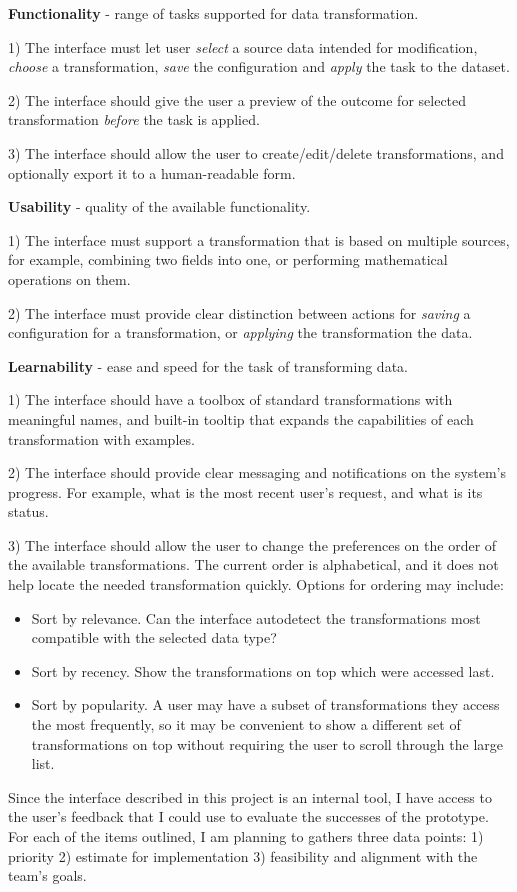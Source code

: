 \documentclass[12pt,letterpaper]{article}
\begin{document}
\bigskip
\textbf{Functionality} - range of tasks supported for data transformation.

1) The interface must let user \textit{select} a source data intended for modification, \textit{choose} a transformation, \textit{save} the configuration and \textit{apply} the task to the dataset.

2) The interface should give the user a preview of the outcome for selected transformation \textit{before} the task is applied.

3) The interface should allow the user to create/edit/delete transformations, and optionally export it to a human-readable form.

\textbf{Usability} - quality of the available functionality.

1) The interface must support a transformation that is based on multiple sources, for example, combining two fields into one, or performing mathematical operations on them.

2) The interface must provide clear distinction between actions for \textit{saving} a configuration for a transformation, or \textit{applying} the transformation the data.

\textbf{Learnability} - ease and speed for the task of transforming data.

1) The interface should have a toolbox of standard transformations with meaningful names, and built-in tooltip that expands the capabilities of each transformation with examples.

2) The interface should provide clear messaging and notifications on the system's progress. For example, what is the most recent user's request, and what is its status.

3) The interface should allow the user to change the preferences on the order of the available transformations. The current order is alphabetical, and it does not help locate the needed transformation quickly. Options for ordering may include: 

\begin{itemize}
    \item Sort by relevance. Can the interface autodetect the transformations most compatible with the selected data type?
    \item Sort by recency. Show the transformations on top which were accessed last.
    \item Sort by popularity. A user may have a subset of transformations they access the most frequently, so it may be convenient to show a different set of transformations on top without requiring the user to scroll through the large list. 
\end{itemize}

Since the interface described in this project is an internal tool, I have access to the user's feedback that I could use to evaluate the successes of the prototype. For each of the items outlined, I am planning to gathers three data points: 1) priority 2) estimate for implementation 3) feasibility and alignment with the team's goals.
\end{document}

